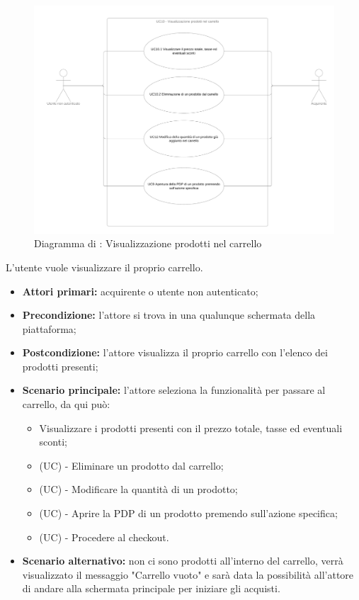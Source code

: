 
\begin{figure}[H]
    \centering
    \includegraphics[width=\textwidth]{Immagini/DiagrammiUC/UC10VisualizzazioneProdottiNelCarrello.png}
    \caption{Diagramma di \actualUC: Visualizzazione prodotti nel carrello} 
    \label{fig:VisualizzazioneProdottiNelCarrello}
\end{figure}
L'utente vuole visualizzare il proprio carrello.
\begin{itemize}
    \item \textbf{Attori primari:} acquirente o utente non autenticato;
    \item \textbf{Precondizione:} l'attore si trova in una qualunque schermata della piattaforma;
    \item \textbf{Postcondizione:} l'attore visualizza il proprio carrello con l'elenco dei prodotti presenti;
    \item \textbf{Scenario principale:} l'attore seleziona la funzionalità per passare al carrello, da qui può:
    \begin{itemize}
        \item Visualizzare i prodotti presenti con il prezzo totale, tasse ed eventuali sconti;
        \item (UC) - Eliminare un prodotto dal carrello;
        \item (UC) - Modificare la quantità di un prodotto;
        \item (UC) - Aprire la PDP di un prodotto premendo sull'azione specifica;
        \item (UC) - Procedere al checkout.
    \end{itemize}
    \item \textbf{Scenario alternativo:} non ci sono prodotti all'interno del carrello, verrà visualizzato il messaggio "Carrello vuoto" e sarà data la possibilità all'attore di andare alla schermata principale per iniziare gli acquisti.
\end{itemize}

